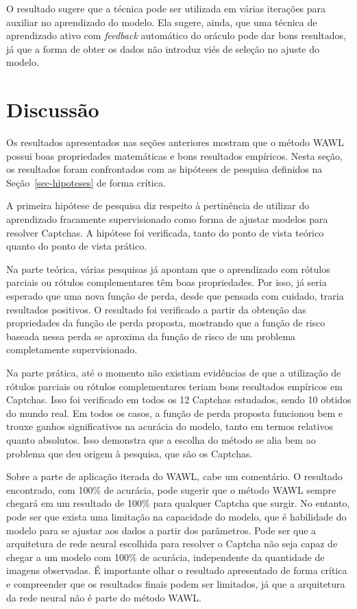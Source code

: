\documentclass[12pt,twoside,brazilian]{book}
\begin{document}
O resultado sugere que a técnica pode ser utilizada em várias iterações
para auxiliar no aprendizado do modelo. Ela sugere, ainda, que uma
técnica de aprendizado ativo com \emph{feedback} automático do oráculo
pode dar bons resultados, já que a forma de obter os dados não introduz
viés de seleção no ajuste do modelo.

\hypertarget{sec-discussao}{%
\section{Discussão}\label{sec-discussao}}

Os resultados apresentados nas seções anteriores mostram que o método
WAWL possui boas propriedades matemáticas e bons resultados empíricos.
Nesta seção, os resultados foram confrontados com as hipóteses de
pesquisa definidos na Seção~\ref{sec-hipoteses} de forma crítica.

A primeira hipótese de pesquisa diz respeito à pertinência de utilizar
do aprendizado fracamente supervisionado como forma de ajustar modelos
para resolver Captchas. A hipótese foi verificada, tanto do ponto de
vista teórico quanto do ponto de vista prático.

Na parte teórica, várias pesquisas já apontam que o aprendizado com
rótulos parciais ou rótulos complementares têm boas propriedades. Por
isso, já seria esperado que uma nova função de perda, desde que pensada
com cuidado, traria resultados positivos. O resultado foi verificado a
partir da obtenção das propriedades da função de perda proposta,
mostrando que a função de risco baseada nessa perda se aproxima da
função de risco de um problema completamente supervisionado.

Na parte prática, até o momento não existiam evidências de que a
utilização de rótulos parciais ou rótulos complementares teriam bons
resultados empíricos em Captchas. Isso foi verificado em todos os 12
Captchas estudados, sendo 10 obtidos do mundo real. Em todos os casos, a
função de perda proposta funcionou bem e trouxe ganhos significativos na
acurácia do modelo, tanto em termos relativos quanto absolutos. Isso
demonstra que a escolha do método se alia bem ao problema que deu origem
à pesquisa, que são os Captchas.

Sobre a parte de aplicação iterada do WAWL, cabe um comentário. O
resultado encontrado, com 100\% de acurácia, pode sugerir que o método
WAWL sempre chegará em um resultado de 100\% para qualquer Captcha que
surgir. No entanto, pode ser que exista uma limitação na capacidade do
modelo, que é habilidade do modelo para se ajustar aos dados a partir
dos parâmetros. Pode ser que a arquitetura de rede neural escolhida para
resolver o Captcha não seja capaz de chegar a um modelo com 100\% de
acurácia, independente da quantidade de imagens observadas. É importante
olhar o resultado apresentado de forma crítica e compreender que os
resultados finais podem ser limitados, já que a arquitetura da rede
neural não é parte do método WAWL.
\end{document}
